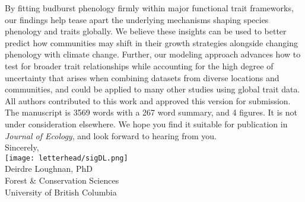 \documentclass[11pt,a4paper]{article}
\begin{document}
\noindent By fitting budburst phenology firmly within major functional trait frameworks, our findings help tease apart the underlying mechanisms shaping species phenology and traits globally. We believe these insights can be used to better predict how communities may shift in their growth strategies alongside changing phenology with climate change. Further, our modeling approach advances how to test for broader trait relationships while accounting for the high degree of uncertainty that arises when combining datasets from diverse locations and communities, and could be applied to many other studies using global trait data.
\vspace{1.5ex}\\
\noindent All authors contributed to this work and approved this version for submission. The manuscript is 3569 words with a 267 word summary, and 4 figures. It is not under consideration elsewhere. We hope you find it suitable for publication in \emph{Journal of Ecology}, and look forward to hearing from you. 
\vspace{1.5ex}\\
\noindent Sincerely, \\
\texttt{[image: letterhead/sigDL.png]} \\
\noindent Deirdre Loughnan, PhD\\
\noindent Forest \& Conservation Sciences\\
\noindent University of British Columbia

\newpage
\end{document}
